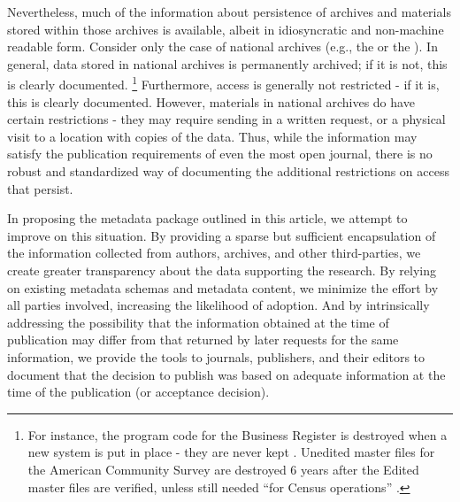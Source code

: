 Nevertheless, much of the information about persistence of archives and
materials stored within those archives is available, albeit in
idiosyncratic and non-machine readable form. Consider only the case of
national archives (e.g., the  or the ). 
In general, data stored in national archives is
permanently archived; if it is not, this is clearly documented.%
\footnote{For instance, the program code for the Business Register is destroyed when a new system is put in place - they are never kept \parencite{U.S.CensusBureauRecordsControlSchedule2009}. Unedited master files for the American Community Survey are destroyed 6 years after the Edited master files are verified, unless still needed ``for Census operations'' \parencite{U.S.CensusBureauRecordsControlSchedule1999}.}
Furthermore, access is generally not restricted - if it is, this is
clearly documented. However, materials in national archives do have
certain restrictions - they may require sending in a written request, or
a physical visit to a location with copies of the data. Thus, while the
information may satisfy the publication requirements of even the most
open journal, there is no robust and standardized way of documenting the
additional restrictions on access that persist. 

In proposing the
metadata package outlined in this article, we attempt to improve on this
situation. By providing a sparse but sufficient encapsulation of the
information collected from authors, archives, and other third-parties,
we create greater transparency about the data supporting the research.
By relying on existing metadata schemas and metadata content, we
minimize the effort by all parties involved, increasing the likelihood
of adoption. And by intrinsically addressing the possibility that the
information obtained at the time of publication may differ from that returned by later
requests for the same information, we provide the tools to journals,
publishers, and their editors to document that the decision to publish
was based on adequate information at the time of the publication (or
acceptance decision).

